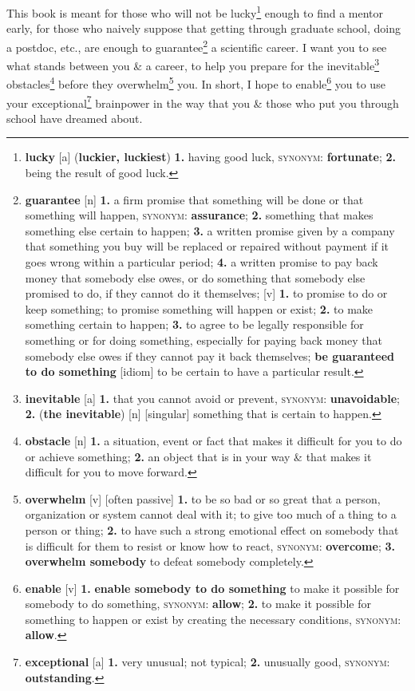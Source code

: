\documentclass[oneside]{book}
\numberwithin{equation}{section}
\begin{document}
This book is meant for those who will not be lucky\footnote{\textbf{lucky} [a] (\textbf{luckier, luckiest}) \textbf{1.} having good luck, \textsc{synonym}: \textbf{fortunate}; \textbf{2.} being the result of good luck.} enough to find a mentor early, for those who naively suppose that getting through graduate school, doing a postdoc, etc., are enough to guarantee\footnote{\textbf{guarantee} [n] \textbf{1.} a firm promise that something will be done or that something will happen, \textsc{synonym}: \textbf{assurance}; \textbf{2.} something that makes something else certain to happen; \textbf{3.} a written promise given by a company that something you buy will be replaced or repaired without payment if it goes wrong within a particular period; \textbf{4.} a written promise to pay back money that somebody else owes, or do something that somebody else promised to do, if they cannot do it themselves; [v] \textbf{1.} to promise to do or keep something; to promise something will happen or exist; \textbf{2.} to make something certain to happen; \textbf{3.} to agree to be legally responsible for something or for doing something, especially for paying back money that somebody else owes if they cannot pay it back themselves; \textbf{be guaranteed to do something} [idiom] to be certain to have a particular result.} a scientific career. I want you to see what stands between you \& a career, to help you prepare for the inevitable\footnote{\textbf{inevitable} [a] \textbf{1.} that you cannot avoid or prevent, \textsc{synonym}: \textbf{unavoidable}; \textbf{2.} (\textbf{the inevitable}) [n] [singular] something that is certain to happen.} obstacles\footnote{\textbf{obstacle} [n] \textbf{1.} a situation, event or fact that makes it difficult for you to do or achieve something; \textbf{2.} an object that is in your way \& that makes it difficult for you to move forward.} before they overwhelm\footnote{\textbf{overwhelm} [v] [often passive] \textbf{1.} to be so bad or so great that a person, organization or system cannot deal with it; to give too much of a thing to a person or thing; \textbf{2.} to have such a strong emotional effect on somebody that is difficult for them to resist or know how to react, \textsc{synonym}: \textbf{overcome}; \textbf{3.} \textbf{overwhelm somebody} to defeat somebody completely.} you. In short, I hope to enable\footnote{\textbf{enable} [v] \textbf{1.} \textbf{enable somebody to do something} to make it possible for somebody to do something, \textsc{synonym}: \textbf{allow}; \textbf{2.} to make it possible for something to happen or exist by creating the necessary conditions, \textsc{synonym}: \textbf{allow}.} you to use your exceptional\footnote{\textbf{exceptional} [a] \textbf{1.} very unusual; not typical; \textbf{2.} unusually good, \textsc{synonym}: \textbf{outstanding}.} brainpower in the way that you \& those who put you through school have dreamed about.
\end{document}
